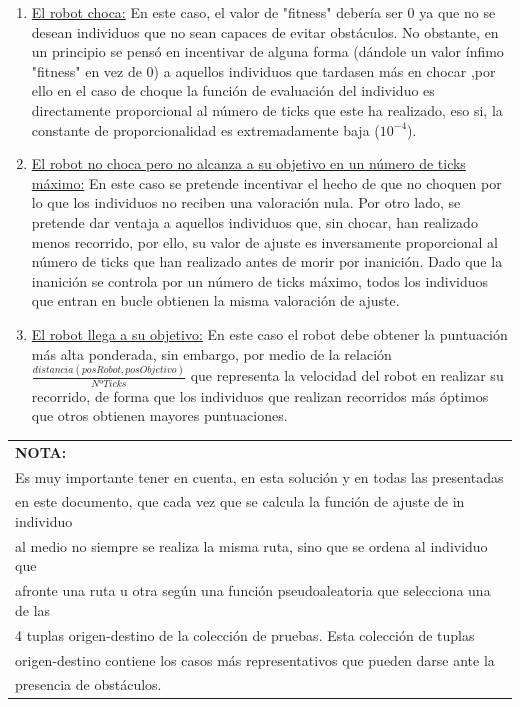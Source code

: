 \documentclass[12pt,spanish]{article}
\begin{document}
\begin{enumerate}
	\item{\underline{El robot choca:} } En este caso, el valor de "fitness" debería ser 0 ya que no se desean individuos que no sean capaces de evitar obstáculos. No obstante, en un principio se pensó en incentivar de alguna forma (dándole un valor ínfimo "fitness" en vez de 0) a aquellos individuos que tardasen más en chocar ,por ello en el caso de choque la función de evaluación del individuo es directamente proporcional al número de ticks que este ha realizado, eso si, la constante de proporcionalidad es extremadamente baja ($10^{-4}$).
	\item{\underline{El robot no choca pero no alcanza a su objetivo en un número de ticks máximo:} }En este caso se pretende incentivar el hecho de que no choquen    por lo que los individuos no reciben una valoración nula. Por otro lado, se pretende dar ventaja a aquellos individuos que, sin chocar, han realizado menos recorrido, por ello, su valor de ajuste es inversamente proporcional al número de ticks que han realizado antes de morir por inanición. Dado que la inanición se controla por un número de ticks máximo, todos los individuos que entran en bucle obtienen la misma valoración de ajuste.
	\item{\underline{El robot llega a su objetivo:} } En este caso el robot debe obtener la puntuación más alta ponderada, sin embargo, por medio de la relación $\frac{distancia(posRobot,posObjetivo)}{NºTicks}$ que representa la velocidad del robot en realizar su recorrido, de forma que los individuos que realizan recorridos más óptimos que otros obtienen mayores puntuaciones.
\end{enumerate}
\begin{tabular}{|l|}
\hline
\textbf{NOTA:}\\
Es muy importante tener en cuenta, en esta solución y en todas las presentadas\\
en este documento, que cada vez que se calcula la función de ajuste de in individuo\\
al medio no siempre se realiza la misma ruta, sino que se ordena al individuo que\\
afronte una ruta u otra según una función pseudoaleatoria que selecciona una de las\\
4 tuplas origen-destino de la colección de pruebas. Esta colección de tuplas\\
origen-destino contiene los casos más representativos que pueden darse ante la\\
presencia de obstáculos.\\
\hline
\end{tabular}\\
\end{document}
